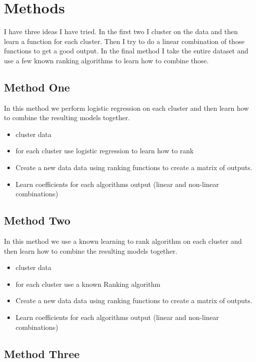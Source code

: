 \documentclass{article}
\begin{document}
	\section{Methods}

		I have three ideas I have tried.
		In the first two I cluster on the data and then learn a function for each cluster.
		Then I try to do a linear combination of those functions to get a good output.
		In the final method I take the entire dataset and use a few known ranking algorithms to learn how to combine those.

		\subsection{Method One}

			In this method we perform logistic regression on each cluster and then learn how to combine the resulting models together.

			\begin{itemize}
				\item cluster data
				\item for each cluster use logistic regression to learn how to rank 
				\item Create a new data data using ranking functions to create a matrix of outputs.
				\item Learn coefficients for each algorithms output (linear and non-linear combinations) 
			\end{itemize}

		\subsection{Method Two}

			In this method we use a known learning to rank algorithm on each cluster and then learn how to combine the resulting models together.
			\begin{itemize}
				\item cluster data
				\item for each cluster use a known Ranking algorithm
				\item Create a new data data using ranking functions to create a matrix of outputs.
				\item Learn coefficients for each algorithms output (linear and non-linear combinations) 
			\end{itemize}

		\subsection{Method Three}
\end{document}
